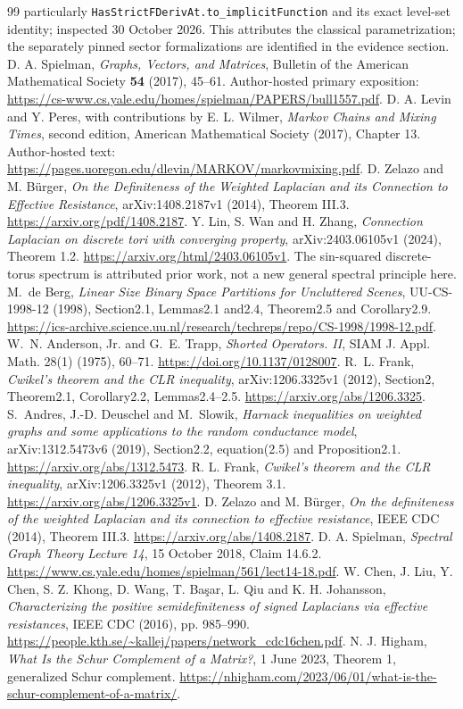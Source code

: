 \documentclass[11pt]{article}
\begin{document}
\begin{thebibliography}{99}
particularly \texttt{HasStrictFDerivAt.to\_implicitFunction} and its exact
level-set identity; inspected 30 October 2026. This attributes the classical parametrization; the separately pinned sector formalizations are identified in the evidence section.
 D. A. Spielman, \emph{Graphs, Vectors, and Matrices},
Bulletin of the American Mathematical Society \textbf{54} (2017), 45--61.
Author-hosted primary exposition:
\url{https://cs-www.cs.yale.edu/homes/spielman/PAPERS/bull1557.pdf}.
 D. A. Levin and Y. Peres, with contributions by
E. L. Wilmer, \emph{Markov Chains and Mixing Times}, second edition,
American Mathematical Society (2017), Chapter 13.
Author-hosted text: \url{https://pages.uoregon.edu/dlevin/MARKOV/markovmixing.pdf}.
 D. Zelazo and M. B{\"u}rger,
\emph{On the Definiteness of the Weighted Laplacian and its Connection to
Effective Resistance}, arXiv:1408.2187v1 (2014), Theorem III.3.
\url{https://arxiv.org/pdf/1408.2187}.
 Y. Lin, S. Wan and H. Zhang,
\emph{Connection Laplacian on discrete tori with converging property},
arXiv:2403.06105v1 (2024), Theorem 1.2.
\url{https://arxiv.org/html/2403.06105v1}.
The sin-squared discrete-torus spectrum is attributed prior work, not a new
general spectral principle here.
 M.~de Berg, \emph{Linear Size Binary Space Partitions for
Uncluttered Scenes}, UU-CS-1998-12 (1998), Section2.1, Lemmas2.1 and2.4,
Theorem2.5 and Corollary2.9.
\url{https://ics-archive.science.uu.nl/research/techreps/repo/CS-1998/1998-12.pdf}.
 W.~N. Anderson, Jr. and G.~E. Trapp,
\emph{Shorted Operators. II}, SIAM J. Appl. Math. 28(1) (1975), 60--71.
\url{https://doi.org/10.1137/0128007}.
 R.~L. Frank, \emph{Cwikel's theorem and the CLR inequality},
arXiv:1206.3325v1 (2012), Section2, Theorem2.1, Corollary2.2, Lemmas2.4--2.5.
\url{https://arxiv.org/abs/1206.3325}.
 S.~Andres, J.-D. Deuschel and M.~Slowik,
\emph{Harnack inequalities on weighted graphs and some applications to the random
conductance model}, arXiv:1312.5473v6 (2019), Section2.2, equation(2.5) and Proposition2.1.
\url{https://arxiv.org/abs/1312.5473}.
 R. L. Frank, \emph{Cwikel's theorem and the CLR inequality},
arXiv:1206.3325v1 (2012), Theorem 3.1.
\url{https://arxiv.org/abs/1206.3325v1}.
 D. Zelazo and M. B\"urger, \emph{On the definiteness of the
weighted Laplacian and its connection to effective resistance},
IEEE CDC (2014), Theorem III.3.
\url{https://arxiv.org/abs/1408.2187}.
 D. A. Spielman, \emph{Spectral Graph Theory Lecture 14},
15 October 2018, Claim 14.6.2.
\url{https://www.cs.yale.edu/homes/spielman/561/lect14-18.pdf}.
 W. Chen, J. Liu, Y. Chen, S. Z. Khong, D. Wang,
T. Ba\c{s}ar, L. Qiu and K. H. Johansson, \emph{Characterizing the positive
semidefiniteness of signed Laplacians via effective resistances},
IEEE CDC (2016), pp. 985--990.
\url{https://people.kth.se/~kallej/papers/network_cdc16chen.pdf}.
 N. J. Higham, \emph{What Is the Schur Complement of a Matrix?}, 1 June 2023, Theorem 1, generalized Schur complement. \url{https://nhigham.com/2023/06/01/what-is-the-schur-complement-of-a-matrix/}.


\end{thebibliography}
\end{document}
